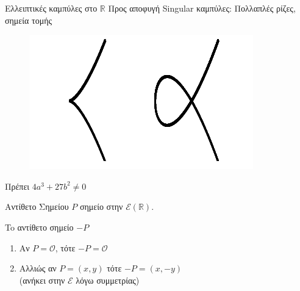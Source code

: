 \documentclass[handout]{beamer}
\begin{document}
\begin{frame}[allowframebreaks]{Ελλειπτικές καμπύλες στο $\mathbb R$}
\alert{Προς αποφυγή} Singular καμπύλες: Πολλαπλές ρίζες, σημεία τομής

\begin{figure}
\includegraphics[scale=0.3]{singular.png}
\end{figure}

Πρέπει $4a^3+27b^2 \neq 0$
\end{frame}

\begin{frame}{Αντίθετο Σημείου}
$P$ σημείο στην $\mathcal E(\mathbb{R})$. 
\pause
\begin{block}{To αντίθετο σημείο $-P$ }  
\begin{enumerate}
    \item Αν $P=\mathcal O$, τότε  $-P=\mathcal O$ 
    \pause
    \item Αλλιώς αν $P=(x,y)$ τότε $-P=(x,-y)$ \\(ανήκει στην $\mathcal E$ λόγω συμμετρίας)
\end{enumerate}
\end{block}
\end{frame}
\end{document}
